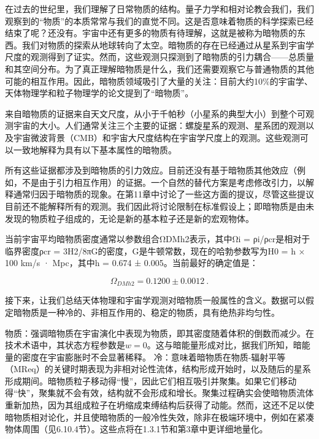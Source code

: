 
在过去的世纪里，我们理解了日常物质的结构。量子力学和相对论教会我们，我们观察到的“物质”的本质常常与我们的直觉不同。这是否意味着物质的科学探索已经结束了呢？还没有。宇宙中还有更多的物质有待理解，这就是被称为暗物质的东西。我们对物质的探索从地球转向了太空。暗物质的存在已经通过从星系到宇宙学尺度的观测得到了证实。然而，这些观测只探测到了暗物质的引力耦合——总质量和其空间分布。为了真正理解暗物质是什么，我们还需要观察它与普通物质的其他可能的相互作用。因此，暗物质领域吸引了大量的关注：目前大约10\%的宇宙学、天体物理学和粒子物理学的论文提到了“暗物质”。

来自暗物质的证据来自天文尺度，从小于千帕秒（小星系的典型大小）到整个可观测宇宙的大小。人们通常关注三个主要的证据：螺旋星系的观测、星系团的观测以及宇宙微波背景（CMB）和宇宙大尺度结构在宇宙学尺度上的观测。这些观测可以一致地解释为具有以下基本属性的暗物质。

所有这些证据都涉及到暗物质的引力效应。目前还没有基于暗物质其他效应（例如，不是由于引力相互作用）的证据。一个自然的替代方案是考虑修改引力，以解释通常归因于暗物质的现象。在第11章中讨论了一些这方面的提议，尽管这些提议目前还不能解释所有的观测。我们因此将讨论限制在标准假设上；即暗物质是由未发现的物质粒子组成的，无论是新的基本粒子还是新的宏观物体。

当前宇宙平均暗物质密度通常以参数组合ΩDMh2表示，其中Ωi = ρi/ρcr是相对于临界密度ρcr = 3H2/8πG的密度，G是牛顿常数，现在的哈勃参数写为H0 = h × 100 km/s · Mpc，其中h = 0.674 ± 0.005。当前最好的确定值是：

\begin{equation}
\Omega_{DMh2} = 0.1200 \pm 0.0012~.
\end{equation}

接下来，让我们总结天体物理和宇宙学观测对暗物质一般属性的含义。数据可以假定暗物质是一种冷的、非相互作用的、稳定的物质，具有绝热非均匀性。

物质：强调暗物质在宇宙演化中表现为物质，即其密度随着体积的倒数而减少。在技术术语中，其状态方程参数是$w = 0$。这与暗能量形成对比，据我们所知，暗能量的密度在宇宙膨胀时不会显著稀释。
冷：意味着暗物质在物质-辐射平等（MReq）的关键时期表现为非相对论性流体，结构形成开始时，以及随后的星系形成期间。暗物质粒子移动得“慢”，因此它们相互吸引并聚集。如果它们移动得“快”，聚集就不会有效，结构就不会形成和增长。聚集过程确实会使暗物质流体重新加热，因为其组成粒子在坍缩成束缚结构后获得了动能。然而，这还不足以使暗物质相对论化，并且使暗物质的一般冷性失效，除非在极端环境中，例如在紧凑物体周围（见6.10.4节）。这些点将在1.3.1节和第3章中更详细地量化。


